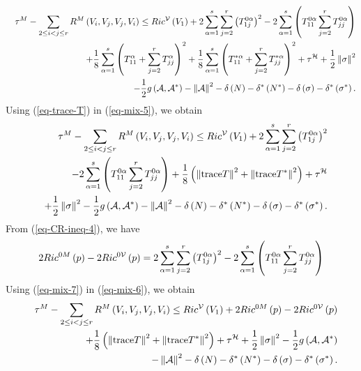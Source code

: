 \documentclass[10pt,a4paper]{article}
\theoremstyle{definition}
\theoremstyle{remark}
\numberwithin{equation}{section}
\begin{document}
\begin{eqnarray}
&&\tau ^{M}-\sum_{2\leq i<j\leq r}R^{M}\left( V_{i},V_{j},V_{j},V_{i}\right)
\leq Ric^{{\cal V}}\left( V_{1}\right) +2\sum_{\alpha
=1}^{s}\sum_{j=2}^{r}\left( T_{1j}^{0\alpha }\right) ^{2}-2\sum_{\alpha
=1}^{s}\left( T_{11}^{0\alpha }\sum_{j=2}^{r}T_{jj}^{0\alpha }\right) 
\nonumber \\
&&+\frac{1}{8}\sum_{\alpha =1}^{s}\left( T_{11}^{\alpha
}+\sum_{j=2}^{r}T_{jj}^{\alpha }\right) ^{2}+\frac{1}{8}\sum_{\alpha
=1}^{s}\left( T_{11}^{\ast \alpha }+\sum_{j=2}^{r}T_{jj}^{\ast \alpha
}\right) ^{2}+\tau ^{{\cal H}}+\frac{1}{2}\left\Vert \sigma \right\Vert ^{2}
\nonumber \\
&&-\frac{1}{2}g\left( {\cal A},{\cal A}^{\ast }\right) -\left\Vert {\cal A}%
\right\Vert ^{2}-\delta \left( N\right) -\delta ^{\ast }\left( N^{\ast
}\right) -\delta \left( \sigma \right) -\delta ^{\ast }\left( \sigma ^{\ast
}\right) .  \label{eq-mix-5}
\end{eqnarray}%
Using (\ref{eq-trace-T}) in (\ref{eq-mix-5}), we obtain%
\begin{eqnarray}
&&\tau ^{M}-\sum_{2\leq i<j\leq r}R^{M}\left( V_{i},V_{j},V_{j},V_{i}\right)
\leq Ric^{{\cal V}}\left( V_{1}\right) +2\sum_{\alpha
=1}^{s}\sum_{j=2}^{r}\left( T_{1j}^{0\alpha }\right) ^{2}  \nonumber \\
&&-2\sum_{\alpha =1}^{s}\left( T_{11}^{0\alpha
}\sum_{j=2}^{r}T_{jj}^{0\alpha }\right) +\frac{1}{8}\left( \left\Vert {\rm %
trace}T\right\Vert ^{2}+\left\Vert {\rm trace}T^{\ast }\right\Vert
^{2}\right) +\tau ^{{\cal H}}  \nonumber \\
&&+\frac{1}{2}\left\Vert \sigma \right\Vert ^{2}-\frac{1}{2}g\left( {\cal A},%
{\cal A}^{\ast }\right) -\left\Vert {\cal A}\right\Vert ^{2}-\delta \left(
N\right) -\delta ^{\ast }\left( N^{\ast }\right) -\delta \left( \sigma
\right) -\delta ^{\ast }\left( \sigma ^{\ast }\right) .  \label{eq-mix-6}
\end{eqnarray}%
From (\ref{eq-CR-ineq-4}), we have%
\begin{equation}
2Ric^{0M}\left( p\right) -2Ric^{0{\cal V}}\left( p\right) =2\sum_{\alpha
=1}^{s}\sum_{j=2}^{r}\left( T_{1j}^{0\alpha }\right) ^{2}-2\sum_{\alpha
=1}^{s}\left( T_{11}^{0\alpha }\sum_{j=2}^{r}T_{jj}^{0\alpha }\right)
\label{eq-mix-7}
\end{equation}%
Using (\ref{eq-mix-7}) in (\ref{eq-mix-6}), we obtain%
\begin{eqnarray}
&&\tau ^{M}-\sum_{2\leq i<j\leq r}R^{M}\left( V_{i},V_{j},V_{j},V_{i}\right)
\leq Ric^{{\cal V}}\left( V_{1}\right) +2Ric^{0M}\left( p\right) -2Ric^{0%
{\cal V}}\left( p\right)  \nonumber \\
&&+\frac{1}{8}\left( \left\Vert {\rm trace}T\right\Vert ^{2}+\left\Vert {\rm %
trace}T^{\ast }\right\Vert ^{2}\right) +\tau ^{{\cal H}}+\frac{1}{2}%
\left\Vert \sigma \right\Vert ^{2}-\frac{1}{2}g\left( {\cal A},{\cal A}%
^{\ast }\right)  \nonumber \\
&&-\left\Vert {\cal A}\right\Vert ^{2}-\delta \left( N\right) -\delta ^{\ast
}\left( N^{\ast }\right) -\delta \left( \sigma \right) -\delta ^{\ast
}\left( \sigma ^{\ast }\right) .  \label{eq-mix-7.4}
\end{eqnarray}%
\end{document}
